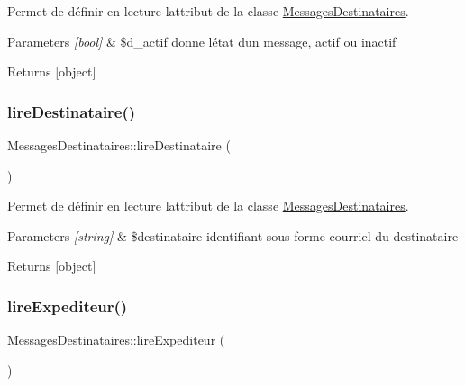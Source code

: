 Permet de définir en lecture l\textquotesingle{}attribut de la classe \hyperlink{class_messages_destinataires}{Messages\+Destinataires}. 


\begin{DoxyParams}{Parameters}
{\em \mbox{[}bool\mbox{]}} & \$d\+\_\+actif donne l\textquotesingle{}état d\textquotesingle{}un message, actif ou inactif \\
\hline
\end{DoxyParams}
\begin{DoxyReturn}{Returns}
\mbox{[}object\mbox{]} 
\end{DoxyReturn}
\mbox{\label{class_messages_destinataires_a1047fa229ad3a1d059ef7d9868f08080}} 
\subsubsection{\texorpdfstring{lire\+Destinataire()}{lireDestinataire()}}
{\footnotesize\ttfamily Messages\+Destinataires\+::lire\+Destinataire (\begin{DoxyParamCaption}{ }\end{DoxyParamCaption})}



Permet de définir en lecture l\textquotesingle{}attribut de la classe \hyperlink{class_messages_destinataires}{Messages\+Destinataires}. 


\begin{DoxyParams}{Parameters}
{\em \mbox{[}string\mbox{]}} & \$destinataire identifiant sous forme courriel du destinataire \\
\hline
\end{DoxyParams}
\begin{DoxyReturn}{Returns}
\mbox{[}object\mbox{]} 
\end{DoxyReturn}
\mbox{\label{class_messages_destinataires_ab1b37cffce0bcc420712e92d0e8540c3}} 
\subsubsection{\texorpdfstring{lire\+Expediteur()}{lireExpediteur()}}
{\footnotesize\ttfamily Messages\+Destinataires\+::lire\+Expediteur (\begin{DoxyParamCaption}{ }\end{DoxyParamCaption})}



